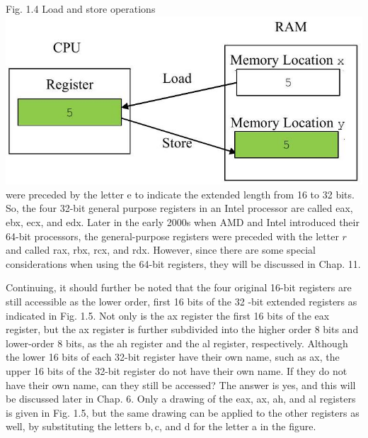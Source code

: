 \documentclass[10pt]{article}
\begin{document}
Fig. 1.4 Load and store operations\\
\includegraphics[max width=\textwidth, center]{2025_03_24_ebe50cc223a6fbc49eecg-024(1)}\\
were preceded by the letter e to indicate the extended length from 16 to 32 bits. So, the four 32-bit general purpose registers in an Intel processor are called eax, ebx, ecx, and edx. Later in the early 2000s when AMD and Intel introduced their 64-bit processors, the general-purpose registers were preceded with the letter $r$ and called rax, rbx, rcx, and rdx. However, since there are some special considerations when using the 64-bit registers, they will be discussed in Chap. 11.

Continuing, it should further be noted that the four original 16-bit registers are still accessible as the lower order, first 16 bits of the 32 -bit extended registers as indicated in Fig. 1.5. Not only is the ax register the first 16 bits of the eax register, but the ax register is further subdivided into the higher order 8 bits and lower-order 8 bits, as the ah register and the al register, respectively. Although the lower 16 bits of each 32-bit register have their own name, such as ax, the upper 16 bits of the 32-bit register do not have their own name. If they do not have their own name, can they still be accessed? The answer is yes, and this will be discussed later in Chap. 6. Only a drawing of the eax, ax, ah, and al registers is given in Fig. 1.5, but the same drawing can be applied to the other registers as well, by substituting the letters $\mathrm{b}, \mathrm{c}$, and d for the letter a in the figure.
\end{document}
